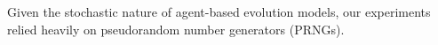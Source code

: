 Given the stochastic nature of agent-based evolution models, our experiments relied heavily on pseudorandom number generators (PRNGs).


